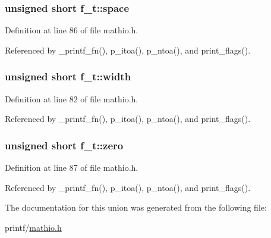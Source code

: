 \subsubsection[{\texorpdfstring{space}{space}}]{\setlength{\rightskip}{0pt plus 5cm}unsigned short f\+\_\+t\+::space}\hypertarget{unionf__t_aba20a97e95d14a076e9c175989022717}{}\label{unionf__t_aba20a97e95d14a076e9c175989022717}


Definition at line 86 of file mathio.\+h.



Referenced by \+\_\+printf\+\_\+fn(), p\+\_\+itoa(), p\+\_\+ntoa(), and print\+\_\+flags().

\subsubsection[{\texorpdfstring{width}{width}}]{\setlength{\rightskip}{0pt plus 5cm}unsigned short f\+\_\+t\+::width}\hypertarget{unionf__t_ad6b1584314c27653690552e95e1ed96f}{}\label{unionf__t_ad6b1584314c27653690552e95e1ed96f}


Definition at line 82 of file mathio.\+h.



Referenced by \+\_\+printf\+\_\+fn(), p\+\_\+itoa(), p\+\_\+ntoa(), and print\+\_\+flags().

\subsubsection[{\texorpdfstring{zero}{zero}}]{\setlength{\rightskip}{0pt plus 5cm}unsigned short f\+\_\+t\+::zero}\hypertarget{unionf__t_ac70397e87721255908299c190f3e5670}{}\label{unionf__t_ac70397e87721255908299c190f3e5670}


Definition at line 87 of file mathio.\+h.



Referenced by \+\_\+printf\+\_\+fn(), p\+\_\+itoa(), p\+\_\+ntoa(), and print\+\_\+flags().



The documentation for this union was generated from the following file\+:\begin{DoxyCompactItemize}
\item 
printf/\hyperlink{mathio_8h}{mathio.\+h}\end{DoxyCompactItemize}
